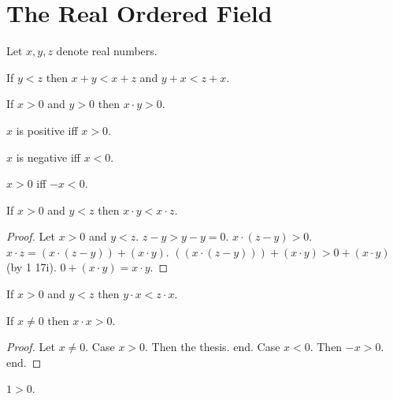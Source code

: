 \documentclass{article}
\begin{document}
\section{The Real Ordered Field}

\begin{forthel}
Let $x,y,z$ denote real numbers.

\begin{axiom}[title=1 17 i]
If $y < z$ then $x + y < x + z$ and $y + x < z + x$.
\end{axiom}

\begin{axiom}[title=1 17 ii]
If $x > 0$ and $y > 0$ then $x \cdot y > 0$.
\end{axiom}

\begin{definition}
$x$ is positive iff $x > 0$.
\end{definition}

\begin{definition}
$x$ is negative iff $x < 0$.
\end{definition}


\begin{proposition}[title=1 18 a]
$x > 0$ iff $-x < 0$.
\end{proposition}

\begin{proposition}[title=1 18 b]
If $x > 0$ and $y < z$ then
$x \cdot y < x \cdot z$.
\end{proposition}
\begin{proof}
Let $x > 0$ and $y < z$.
$z - y > y - y = 0$.
$x \cdot (z - y) > 0$.
$x \cdot z = (x \cdot (z - y)) + (x \cdot y)$.
$((x \cdot (z - y))) + (x \cdot y)  > 0 + (x \cdot y)$ (by 1 17i).
$0 + (x \cdot y) = x \cdot y$.
\end{proof}

\begin{proposition}[title=1 18 bb]
If $x > 0$ and $y < z$ then
$y \cdot x < z \cdot x$.
\end{proposition}


\begin{proposition}[title=1 18 d]
If $x \neq 0$ then $x \cdot x > 0$.
\end{proposition}
\begin{proof}
Let $x \neq 0$.
Case $x > 0$. Then the thesis. end.
Case $x < 0$. Then $ -x > 0$. end.
\end{proof}

\begin{proposition}[title=1 18 dd]
$1 > 0$.
\end{proposition}


\end{forthel}
\end{document}
